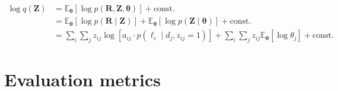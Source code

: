 \begin{equation}
\begin{split}
    \log q(\bm{Z}) & = \mathbb{E}_{\bm\theta}\left[\log p(\bm{R},\bm{Z},\bm{\theta})\right] + \textrm{const.} \\
    & = \mathbb{E}_{\bm\theta}\left[\log p(\bm{R}\mid\bm{Z})\right] + \mathbb{E}_{\bm\theta}\left[\log p(\bm{Z}\mid\bm{\theta})\right] + \textrm{const.} \\
    & = \sum_i\sum_j z_{ij}\log\left[a_{ij}\cdot p(\ell_i\mid d_j,z_{ij}=1)\right] + \sum_i\sum_j z_{ij}\mathbb{E}_{\bm\theta}\left[\log\theta_j\right] + \textrm{const.}
\end{split}
\end{equation}

\chapter{Evaluation metrics}

\lipsum[32]